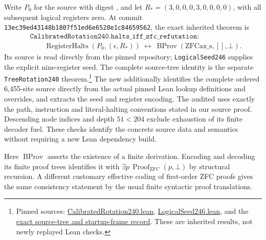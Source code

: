 Write $P_0$ for the source with digest
,
and let $R_*=(3,0,0,0,3,0,0,0,0)$, with all subsequent logical registers
zero.  At commit
\texttt{13ec39ed43148b1807f51ed6e6528e1c84659562}, the exact inherited
theorem is
\begin{align*}
 &\texttt{CalibratedRotation240.halts\_iff\_zfc\_refutation}:\\[-2pt]
 &\qquad
 \operatorname{RegisterHalts}(P_0,(\epsilon,R_*))
 \ \longleftrightarrow\
 \operatorname{BProv}(\mathrm{ZFCax\_s},[],\bot).
 \tag{C0}
\end{align*}
Its source is read directly from the pinned repository;
\texttt{LogicalSeed246} supplies the explicit nine-register seed.
The complete source-tree identity is the separate
\texttt{TreeRotation240} theorem.\footnote{Pinned sources:
\href{https://github.com/VladimirReshetnikov/ProveIt/blob/13ec39ed43148b1807f51ed6e6528e1c84659562/Computability/BusyBeaver/Lean/BusyBeaver/ZFC/CalibratedRotation240.lean}{CalibratedRotation240.lean},
\href{https://github.com/VladimirReshetnikov/ProveIt/blob/13ec39ed43148b1807f51ed6e6528e1c84659562/Computability/BusyBeaver/Lean/BusyBeaver/ZFC/LogicalSeed246.lean}{LogicalSeed246.lean}, and the
\href{https://github.com/VladimirReshetnikov/ProveIt/blob/13ec39ed43148b1807f51ed6e6528e1c84659562/Computability/BusyBeaver/Research/ZFC/rotation240_tree_frame.md}{exact source-tree and startup-frame record}.
These are inherited results, not newly replayed Lean checks.}
The new  additionally
identifies the complete ordered 6,455-site source directly from the actual
pinned Lean lookup definitions and overrides, and extracts the seed and
register encoding.  The audited 
uses exactly the path, instruction and literal-halting conventions stated
in our source proof.  Descending node indices and depth $51<204$ exclude
exhaustion of its finite decoder fuel.  These checks identify the concrete
source data and semantics without requiring a new Lean dependency build.

Here $\operatorname{BProv}$ asserts the existence of a finite derivation.
Encoding and decoding its finite proof trees identifies it with
$\exists p\,\operatorname{Proof}_{\mathrm{ZFC}}(p,\bot)$ by structural
recursion.  A different customary effective coding of first-order ZFC
proofs gives the same consistency statement by the usual finite syntactic
proof translations.

